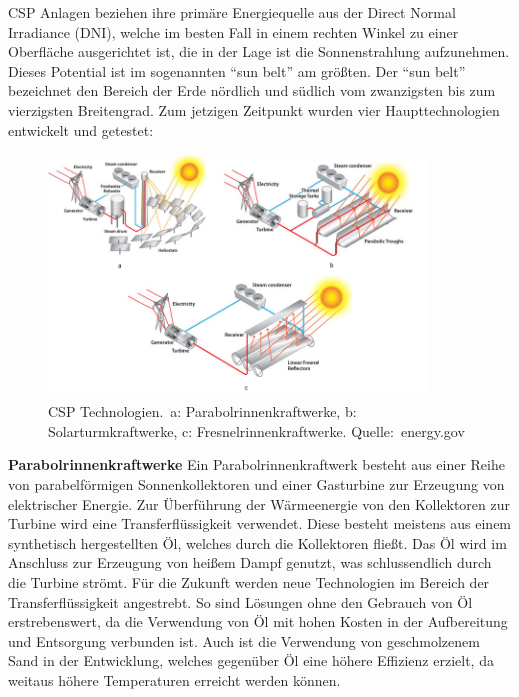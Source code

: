 CSP Anlagen beziehen ihre primäre Energiequelle aus der Direct Normal Irradiance (DNI), welche im besten Fall in einem rechten Winkel zu einer Oberfläche ausgerichtet ist, die in der Lage ist die Sonnenstrahlung aufzunehmen. Dieses Potential ist im sogenannten "`sun belt"' am größten. Der "`sun belt"' bezeichnet den Bereich der Erde nördlich und südlich vom zwanzigsten bis zum vierzigsten Breitengrad. Zum jetzigen Zeitpunkt wurden vier Haupttechnologien entwickelt und getestet\cite{viebahn2011}:

\begin{figure}[H]
	\centering
	\includegraphics[width=0.9\textwidth,trim=1 1 1 1,clip]{technik.png}
	\caption{CSP Technologien.\ a: Parabolrinnenkraftwerke, b: Solarturmkraftwerke, c: Fresnelrinnenkraftwerke. Quelle:~energy.gov}
	\label{fig:technik}
\end{figure}

\textbf{Parabolrinnenkraftwerke}
\newline
Ein Parabolrinnenkraftwerk besteht aus einer Reihe von parabelförmigen Sonnenkollektoren und einer Gasturbine zur Erzeugung von elektrischer Energie. Zur Überführung der Wärmeenergie von den Kollektoren zur Turbine wird eine Transferflüssigkeit verwendet. Diese besteht meistens aus einem synthetisch hergestellten Öl, welches durch die Kollektoren fließt. Das Öl wird im Anschluss zur Erzeugung von heißem Dampf genutzt, was schlussendlich durch die Turbine strömt. Für die Zukunft werden neue Technologien im Bereich der Transferflüssigkeit angestrebt. So sind Lösungen ohne den Gebrauch von Öl erstrebenswert, da die Verwendung von Öl mit hohen Kosten in der Aufbereitung und Entsorgung verbunden ist. Auch ist die Verwendung von geschmolzenem Sand in der Entwicklung, welches gegenüber Öl eine höhere Effizienz erzielt, da weitaus höhere Temperaturen erreicht werden können.
\cite{viebahn2008}

